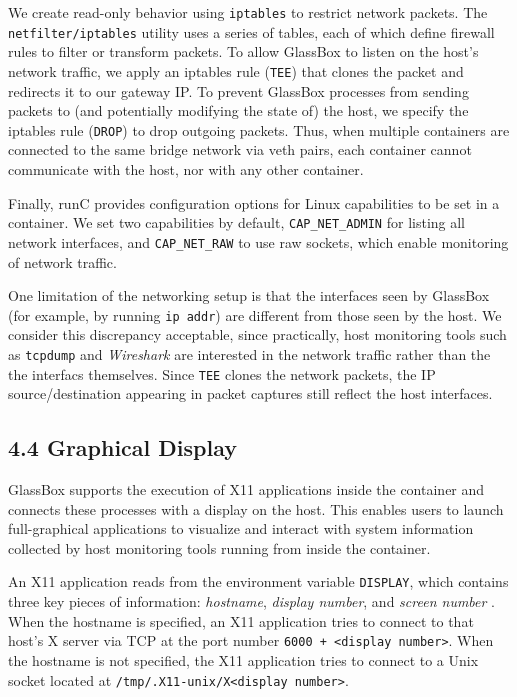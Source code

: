 \documentclass{proc}
\begin{document}
We create read-only behavior using \texttt{iptables} to restrict network packets. The \texttt{netfilter/iptables} utility uses a series of tables, each of which define firewall rules to filter or transform packets. To allow GlassBox to listen on the host's network traffic, we apply an iptables rule (\texttt{TEE}) that clones the packet and redirects it to our gateway IP. To prevent GlassBox processes from sending packets to (and potentially modifying the state of) the host, we specify the iptables rule (\texttt{DROP}) to drop outgoing packets. Thus, when multiple containers are connected to the same bridge network via veth pairs, each container cannot communicate with the host, nor with any other container.

Finally, runC provides configuration options for Linux capabilities to be set in a container. We set two capabilities by default, \texttt{CAP\_NET\_ADMIN} for listing all network interfaces, and \texttt{CAP\_NET\_RAW} to use raw sockets, which enable monitoring of network traffic.

One limitation of the networking setup is that the interfaces seen by GlassBox (for example, by running \texttt{ip addr}) are different from those seen by the host. We consider this discrepancy acceptable, since practically, host monitoring tools such as \texttt{tcpdump} and \textit{Wireshark} are interested in the network traffic rather than the the interfacs themselves. Since \texttt{TEE} clones the network packets, the IP source/destination appearing in packet captures still reflect the host interfaces.

\subsection*{4.4 Graphical Display}

GlassBox supports the execution of X11 applications inside the container and connects these processes with a display on the host. This enables users to launch full-graphical applications to visualize and interact with system information collected by host monitoring tools running from inside the container.

An X11 application reads from the environment variable \texttt{DISPLAY}, which contains three key pieces of information: \textit{hostname}, \textit{display number}, and \textit{screen number} \cite{xman}. When the hostname is specified, an X11 application tries to connect to that host's X server via TCP at the port number \texttt{6000 + <display number>}. When the hostname is not specified, the X11 application tries to connect to a Unix socket located at \texttt{/tmp/.X11-unix/X<display number>}.
\end{document}
